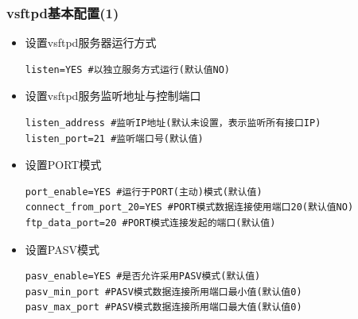 \documentclass[xcolor=svgnames,presentation]{beamer}
\begin{document}
\begin{frame}[fragile]
\frametitle{vsftpd基本配置(1)}
\label{sec-3-3}
\begin{itemize}

\item 设置vsftpd服务器运行方式\\
\label{sec-3-3-1}%
\begin{verbatim}
listen=YES #以独立服务方式运行(默认值NO)
\end{verbatim}

\item 设置vsftpd服务监听地址与控制端口\\
\label{sec-3-3-2}%
\begin{verbatim}
listen_address #监听IP地址(默认未设置，表示监听所有接口IP)
listen_port=21 #监听端口号(默认值)
\end{verbatim}

\item 设置PORT模式\\
\label{sec-3-3-3}%
\begin{verbatim}
port_enable=YES #运行于PORT(主动)模式(默认值)
connect_from_port_20=YES #PORT模式数据连接使用端口20(默认值NO)
ftp_data_port=20 #PORT模式连接发起的端口(默认值)
\end{verbatim}

\item 设置PASV模式\\
\label{sec-3-3-4}%
\begin{verbatim}
pasv_enable=YES #是否允许采用PASV模式(默认值)
pasv_min_port #PASV模式数据连接所用端口最小值(默认值0)
pasv_max_port #PASV模式数据连接所用端口最大值(默认值0)
\end{verbatim}
\end{itemize} %
\end{frame}
\end{document}
